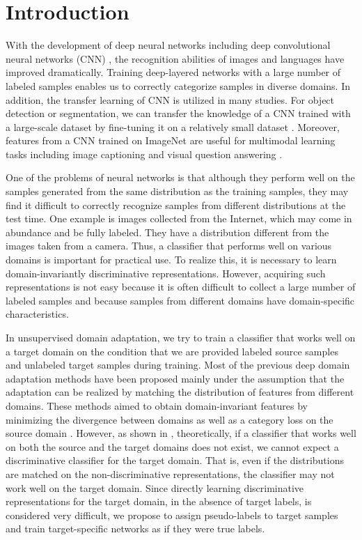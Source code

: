 \documentclass{article}
\begin{document}
\section{Introduction}
With the development of deep neural networks including deep convolutional neural networks (CNN) \cite{krizhevsky2012imagenet}, the recognition abilities of images and languages have improved dramatically. Training deep-layered networks with a large number of labeled samples enables us to correctly categorize samples in diverse domains. In addition, the transfer learning of CNN is utilized in many studies. For object detection or segmentation, we can transfer the knowledge of a CNN trained with a large-scale dataset by fine-tuning it on a relatively small dataset \cite{girshick2014rich,long2015fully}. Moreover, features from a CNN trained on ImageNet \cite{deng2009imagenet} are useful for multimodal learning tasks including image captioning \cite{vinyals2015show} and visual question answering \cite{antol2015vqa}.

One of the problems of neural networks is that although they perform well on the samples generated from the same distribution as the training samples, they may find it difficult to correctly recognize samples from different distributions at the test time.
One example is images collected from the Internet, which may come in abundance and be fully labeled. They have a distribution different from the images taken from a camera. Thus, a classifier that performs well on various domains is important for practical use. To realize this, it is necessary to learn domain-invariantly discriminative representations. However, acquiring such representations is not easy because it is often difficult to collect a large number of labeled samples and because samples from different domains have domain-specific characteristics.

In unsupervised domain adaptation, we try to train a classifier that works well on a target domain on the condition that we are provided labeled source samples and unlabeled target samples during training.
Most of the previous deep domain adaptation methods have been proposed mainly under the assumption that the adaptation can be realized by matching the distribution of features from different domains. These methods aimed to obtain domain-invariant features by minimizing the divergence between domains as well as a category loss on the source domain \cite{ganin2014unsupervised,long2015learning,long2016unsupervised}. However, as shown in \cite{ben2010theory}, theoretically, if a classifier that works well on both the source and the target domains does not exist, we cannot expect a discriminative classifier for the target domain. That is, even if the distributions are matched on the non-discriminative representations, the classifier may not work well on the target domain. Since directly learning discriminative representations for the target domain, in the absence of target labels, is considered very difficult, we propose to assign pseudo-labels to target samples and train target-specific networks as if they were true labels.
\end{document}
